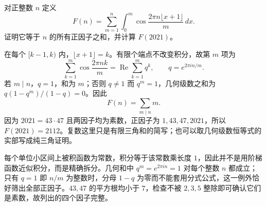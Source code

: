 \documentclass[UTF8,12pt,a4paper,fontset=fandol]{ctexart}
\begin{document}
\begin{example}\label{nm-2020-6}
对正整数 $n$ 定义
\[
 F(n)=\sum_{m=1}^n\int_0^m\cos\frac{2\pi n\lfloor x+1\rfloor}{m}\,dx.
\]
证明它等于 $n$ 的所有正因子之和，并计算 $F(2021)$。
\end{example}
\begin{solve}
在每个 $[k-1,k)$ 内，$\lfloor x+1\rfloor=k$。有限个端点不改变积分，故第 $m$ 项为
\[
 \sum_{k=1}^m\cos\frac{2\pi nk}{m}
 =\operatorname{Re}\sum_{k=1}^m q^k,
 \qquad q=e^{2\pi i n/m}.
\]
若 $m\mid n$，$q=1$，和为 $m$；否则 $q\ne1$ 而 $q^m=1$，几何级数之和为 $q(1-q^m)/(1-q)=0$。因此
\[
 F(n)=\sum_{m\mid n}m.
\]
因为 $2021=43\cdot47$ 且两因子均为素数，正因子为 $1,43,47,2021$，所以 $F(2021)=2112$。复数这里只是有限三角和的简写；也可以取几何级数恒等式的实部写成纯三角证明。

每个单位小区间上被积函数为常数，积分等于该常数乘长度 $1$，因此并不是用阶梯函数近似积分，而是精确拆分。几何和中 $q^m=e^{2\pi in}=1$ 对每个整数 $n$ 都成立；只有 $q=1$ 即 $n/m$ 为整数时，分母 $1-q$ 为零而不能套用分式公式，这一例外恰好筛出全部正因子。$43,47$ 的平方根均小于 $7$，检查不被 $2,3,5$ 整除即可确认它们是素数，故列出的四个因子完整。

\end{solve}
\end{document}
